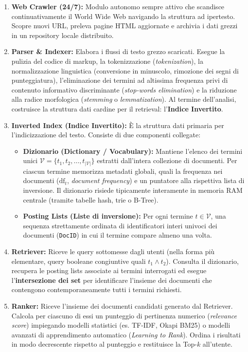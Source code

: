 \begin{enumerate}
  \item \textbf{Web Crawler (24/7):} Modulo autonomo sempre attivo che scandisce continuativamente il World Wide Web navigando la struttura ad ipertesto. Scopre nuovi URL, preleva pagine HTML aggiornate e archivia i dati grezzi in un repository locale distribuito.
  \item \textbf{Parser \& Indexer:} Elabora i flussi di testo grezzo scaricati. Esegue la pulizia del codice di markup, la tokenizzazione (\textit{tokenization}), la normalizzazione linguistica (conversione in minuscolo, rimozione dei segni di punteggiatura), l'eliminazione dei termini ad altissima frequenza privi di contenuto informativo discriminante (\textit{stop-words elimination}) e la riduzione alla radice morfologica (\textit{stemming} o \textit{lemmatization}). Al termine dell'analisi, costruisce la struttura dati cardine per il retrieval: l'\textbf{Indice Invertito}.
  \item \textbf{Inverted Index (Indice Invertito):} È la struttura dati primaria per l'indicizzazione del testo. Consiste di due componenti collegate:
  \begin{itemize}
    \item \textbf{Dizionario (Dictionary / Vocabulary):} Mantiene l'elenco dei termini unici $\mathcal{V} = \{t_1, t_2, \dots, t_{|\mathcal{V}|}\}$ estratti dall'intera collezione di documenti. Per ciascun termine memorizza metadati globali, quali la frequenza nei documenti ($\text{df}_t$, \textit{document frequency}) e un puntatore alla rispettiva lista di inversione. Il dizionario risiede tipicamente interamente in memoria RAM centrale (tramite tabelle hash, trie o B-Tree).
    \item \textbf{Posting Lists (Liste di inversione):} Per ogni termine $t \in \mathcal{V}$, una sequenza strettamente ordinata di identificatori interi univoci dei documenti (\texttt{DocID}) in cui il termine compare almeno una volta.
  \end{itemize}
  \item \textbf{Retriever:} Riceve le query sottomesse dagli utenti (nella forma più elementare, query booleane congiuntive quali $t_1 \land t_2$). Consulta il dizionario, recupera le posting lists associate ai termini interrogati ed esegue l'\textbf{intersezione dei set} per identificare l'insieme dei documenti che contengono contemporaneamente tutti i termini richiesti.
  \item \textbf{Ranker:} Riceve l'insieme dei documenti candidati generato dal Retriever. Calcola per ciascuno di essi un punteggio di pertinenza numerico (\textit{relevance score}) impiegando modelli statistici (es. TF-IDF, Okapi BM25) o modelli avanzati di apprendimento automatico (\textit{Learning to Rank}). Ordina i risultati in modo decrescente rispetto al punteggio e restituisce la Top-$k$ all'utente.
\end{enumerate}

